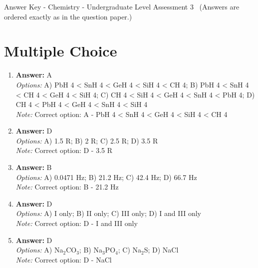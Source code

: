 \documentclass[12pt]{article}
\begin{document}
\begin{center}
Answer Key - Chemistry - Undergraduate Level Assessment 3 \
\small (Answers are ordered exactly as in the question paper.)
\end{center}

\section*{Multiple Choice}
\begin{enumerate}[label=\arabic*.]
\item \textbf{Answer:} A
\\ \textit{Options:} A) PbH 4 \textless{} SnH 4 \textless{} GeH 4 \textless{} SiH 4 \textless{} CH 4; B) PbH 4 \textless{} SnH 4 \textless{} CH 4 \textless{} GeH 4 \textless{} SiH 4; C) CH 4 \textless{} SiH 4 \textless{} GeH 4 \textless{} SnH 4 \textless{} PbH 4; D) CH 4 \textless{} PbH 4 \textless{} GeH 4 \textless{} SnH 4 \textless{} SiH 4
\\ \textit{Note:} Correct option: A - PbH 4 \textless{} SnH 4 \textless{} GeH 4 \textless{} SiH 4 \textless{} CH 4
\item \textbf{Answer:} D
\\ \textit{Options:} A) 1.5 R; B) 2 R; C) 2.5 R; D) 3.5 R
\\ \textit{Note:} Correct option: D - 3.5 R
\item \textbf{Answer:} B
\\ \textit{Options:} A) 0.0471 Hz; B) 21.2 Hz; C) 42.4 Hz; D) 66.7 Hz
\\ \textit{Note:} Correct option: B - 21.2 Hz
\item \textbf{Answer:} D
\\ \textit{Options:} A) I only; B) II only; C) III only; D) I and III only
\\ \textit{Note:} Correct option: D - I and III only
\item \textbf{Answer:} D
\\ \textit{Options:} A) Na$_{2}$CO$_{3}$; B) Na$_{3}$PO$_{4}$; C) Na$_{2}$S; D) NaCl
\\ \textit{Note:} Correct option: D - NaCl
\end{enumerate}
\end{document}
